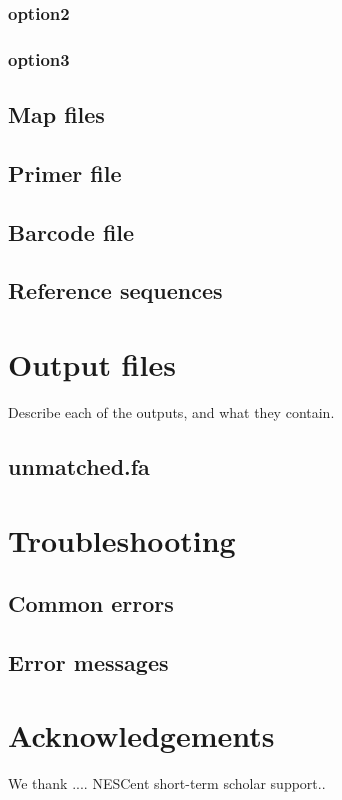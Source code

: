 \documentclass[12pt,letterpaper]{article}
\begin{document}
\subsubsection{option2}

\subsubsection{option3}

\subsection{Map files}

\subsection{Primer file}

\subsection{Barcode file}

\subsection{Reference sequences}

\bigskip\section{Output files}
Describe each of the outputs, and what they contain.

\subsection{unmatched.fa}

\bigskip\section{Troubleshooting}
\subsection{Common errors}
\subsection{Error messages}


\bigskip\section{Acknowledgements}
We thank .... NESCent short-term scholar support.. 
\end{document}
